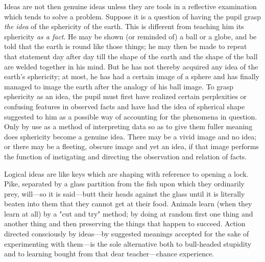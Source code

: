 \documentclass[letterpaper]{book}
\begin{document}

Ideas are not then genuine ideas unless they are tools in a reflective
examination which tends to solve a problem. Suppose it is a question of
having the pupil grasp \emph{the idea} of the sphericity of the earth.
This is different from teaching him its sphericity \emph{as a fact}. He
may be shown (or reminded of) a ball or a globe, and be told that the
earth is round like those things; he may then be made to repeat that
statement day after day till the shape of the earth and the shape of the
ball are welded together in his mind. But he has not thereby acquired
any idea of the earth's sphericity; at most, he has had a certain image
of a sphere and has finally managed to image the earth after the analogy
of his ball image. To grasp sphericity as an idea, the pupil must first
have realized certain perplexities or confusing features in observed
facts and have had the idea of spherical shape suggested to him as a
possible way of accounting for the phenomena in question. Only by use as
a method of interpreting data so as to give them fuller meaning does
sphericity become a genuine idea. There may be a vivid image and no
idea; or there may be a fleeting, obscure image and yet an idea, if that
image performs the function of instigating and directing the observation
and relation of facts.


Logical ideas are like keys which are shaping with reference to opening
a lock. Pike, separated by a glass partition from the fish upon which
they ordinarily prey, will---so it is said---butt their heads against
the glass until it is literally beaten into them that they cannot get at
their food. Animals learn (when they learn at all) by a "cut and try"
method; by doing at
random
first one thing and another thing and then preserving the things that
happen to succeed. Action directed consciously by ideas---by suggested
meanings accepted for the sake of experimenting with them---is the sole
alternative both to bull-headed stupidity and to learning bought from
that dear teacher---chance experience.

\end{document}
